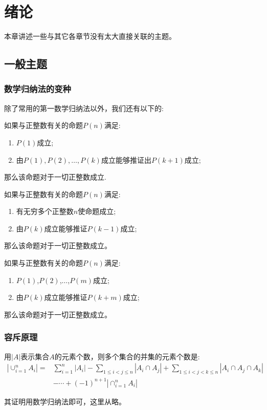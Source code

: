 
\chapter{绪论}
\label{chap:general-topic}

本章讲述一些与其它各章节没有太大直接关联的主题。

\section{一般主题}

\subsection{数学归纳法的变种}
\label{sec:mathematical-induction}
除了常用的第一数学归纳法以外，我们还有以下的:
\begin{principle}[第二数学归纳法]
如果与正整数有关的命题$P(n)$满足:
  \begin{enumerate}
  \item $P(1)$成立;
  \item 由$P(1),P(2),\dots,P(k)$成立能够推证出$P(k+1)$成立;
  \end{enumerate}
那么该命题对于一切正整数成立.
\end{principle}
\begin{principle}[第三数学归纳法]
如果与正整数有关的命题$P(n)$满足:
  \begin{enumerate}
  \item 有无穷多个正整数$n$使命题成立;
  \item 由$P(k)$成立能够推证$P(k-1)$成立;
  \end{enumerate}
那么该命题对于一切正整数成立。
\end{principle}
\begin{principle}[跳跃数学归纳法]
  如果与正整数有关的命题$P(n)$满足:
  \begin{enumerate}
  \item $P(1)$,$P(2)$,$\ldots$,$P(m)$成立;
  \item 由$P(k)$成立能够推证$P(k+m)$成立;
  \end{enumerate}
那么该命题对于一切正整数成立。
\end{principle}


\subsection{容斥原理}
\label{sec:inclusion-exclusion-principle}

\begin{principle}[容斥原理]
  用$|A|$表示集合$A$的元素个数，则多个集合的并集的元素个数是:
  \begin{equation}
    \label{eq:inclusion-exclusion-principle}
    \begin{split}
    |\cup_{i=1}^nA_i|= & \sum_{i=1}^n|A_i|-\sum_{1\leqslant i <j \leqslant n}|A_i \cap A_j|+\sum_{1 \leqslant i <j <k \leqslant n}|A_i\cap A_j \cap A_k| \\
 & -\cdots+(-1)^{n+1}|\cap_{i=1}^nA_i|
    \end{split}
  \end{equation}
\end{principle}
其证明用数学归纳法即可，这里从略。


